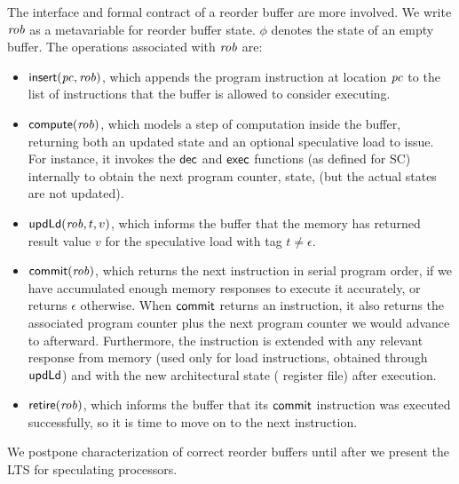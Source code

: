 The interface and formal contract of a reorder buffer are more
involved.  We write $\mathit{rob}$ as a metavariable for reorder buffer
state. $\phi$ denotes the state of an empty buffer. The operations associated with $\mathit{rob}$ are:
\begin{itemize}
\item $\mathsf{insert}(\mathit{pc}, \mathit{rob})$, which appends the program instruction at location $\mathit{pc}$ to the list of instructions that the buffer is allowed to consider executing.
\item $\mathsf{compute}(\mathit{rob})$, which models a
step of computation inside the buffer, returning both an updated state
and an optional speculative load to issue. For instance, it invokes the $\mathsf{dec}$
and $\mathsf{exec}$ functions (as defined for SC) internally to obtain the next program
counter, state, \etc{} (but the actual states are not updated).
\item $\mathsf{upd}\mathsf{Ld}(\mathit{rob},t,v)$, which informs the buffer that the memory
has returned result value $v$ for the speculative load with tag $t \neq \epsilon$.
\item $\mathsf{commit}(\mathit{rob})$, which returns the next instruction in serial
program order, if we have accumulated enough memory responses to execute it
accurately, or returns
$\epsilon$ otherwise.  When $\mathsf{commit}$ returns an instruction, it also
returns the associated program counter plus the next program counter
we would advance to afterward.
 Furthermore, the instruction is
extended with any relevant response from memory (used only for load
instructions, obtained through $\mathsf{upd}\mathsf{Ld}$) and with the new architectural state (\eg{} register
file) after execution.
\item $\mathsf{retire}(\mathit{rob})$, which informs the buffer that its $\mathsf{commit}$
instruction was executed successfully, so it is time to move on to the
next instruction.
\end{itemize}

We postpone characterization of correct reorder buffers until after we
present the LTS for speculating processors.

